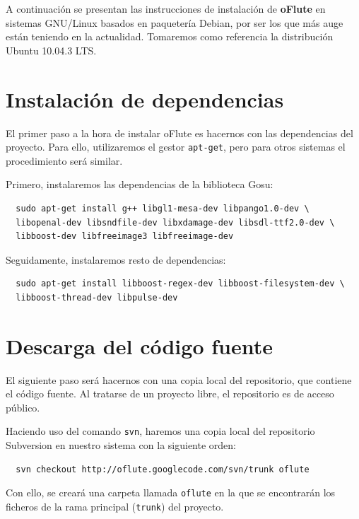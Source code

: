 A continuación se presentan las instrucciones de instalación de \textbf{oFlute}
en sistemas GNU/Linux basados en paquetería Debian\cite{refdebian}, por
ser los que más auge están teniendo en la actualidad. Tomaremos como referencia
la distribución Ubuntu 10.04.3 LTS\cite{refubuntu}.

\section{Instalación de dependencias}

El primer paso a la hora de instalar oFlute es hacernos con las dependencias del
proyecto. Para ello, utilizaremos el gestor \texttt{apt-get}, pero para otros
sistemas el procedimiento será similar.

Primero, instalaremos las dependencias de la biblioteca Gosu:

\begin{verbatim}
  sudo apt-get install g++ libgl1-mesa-dev libpango1.0-dev \
  libopenal-dev libsndfile-dev libxdamage-dev libsdl-ttf2.0-dev \
  libboost-dev libfreeimage3 libfreeimage-dev
\end{verbatim}

Seguidamente, instalaremos resto de dependencias:

\begin{verbatim}
  sudo apt-get install libboost-regex-dev libboost-filesystem-dev \ 
  libboost-thread-dev libpulse-dev
\end{verbatim}

\section{Descarga del código fuente}

El siguiente paso será hacernos con una copia local del repositorio, que
contiene el código fuente. Al tratarse de un proyecto libre, el repositorio es
de acceso público\cite{ofluteforja}.

Haciendo uso del comando \texttt{svn}, haremos una copia local del repositorio
Subversion\cite{refsubversion} en nuestro sistema con la siguiente orden:

\begin{verbatim}
  svn checkout http://oflute.googlecode.com/svn/trunk oflute
\end{verbatim}

Con ello, se creará una carpeta llamada \texttt{oflute} en la que se encontrarán
los ficheros de la rama principal (\texttt{trunk}) del proyecto.

